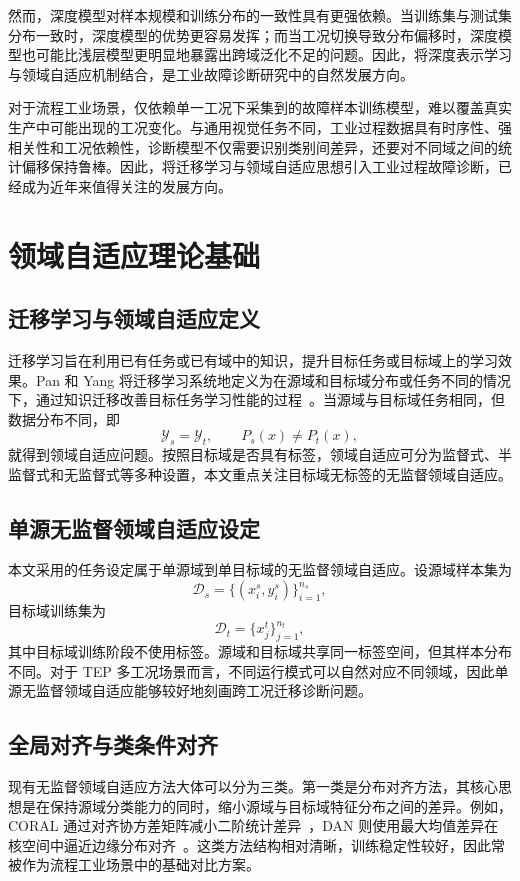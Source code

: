 然而，深度模型对样本规模和训练分布的一致性具有更强依赖。当训练集与测试集分布一致时，深度模型的优势更容易发挥；而当工况切换导致分布偏移时，深度模型也可能比浅层模型更明显地暴露出跨域泛化不足的问题。因此，将深度表示学习与领域自适应机制结合，是工业故障诊断研究中的自然发展方向。

对于流程工业场景，仅依赖单一工况下采集到的故障样本训练模型，难以覆盖真实生产中可能出现的工况变化。与通用视觉任务不同，工业过程数据具有时序性、强相关性和工况依赖性，诊断模型不仅需要识别类别间差异，还要对不同域之间的统计偏移保持鲁棒。因此，将迁移学习与领域自适应思想引入工业过程故障诊断，已经成为近年来值得关注的发展方向。

\section{领域自适应理论基础}
\subsection{迁移学习与领域自适应定义}
迁移学习旨在利用已有任务或已有域中的知识，提升目标任务或目标域上的学习效果。Pan 和 Yang 将迁移学习系统地定义为在源域和目标域分布或任务不同的情况下，通过知识迁移改善目标任务学习性能的过程~\cite{pan2009survey}。当源域与目标域任务相同，但数据分布不同，即
\begin{equation}
\mathcal{Y}_s=\mathcal{Y}_t,\qquad P_s(x)\neq P_t(x),
\end{equation}
就得到领域自适应问题。按照目标域是否具有标签，领域自适应可分为监督式、半监督式和无监督式等多种设置，本文重点关注目标域无标签的无监督领域自适应。

\subsection{单源无监督领域自适应设定}
本文采用的任务设定属于单源域到单目标域的无监督领域自适应。设源域样本集为
\begin{equation}
\mathcal{D}_s=\{(x_i^s,y_i^s)\}_{i=1}^{n_s},
\end{equation}
目标域训练集为
\begin{equation}
\mathcal{D}_t=\{x_j^t\}_{j=1}^{n_t},
\end{equation}
其中目标域训练阶段不使用标签。源域和目标域共享同一标签空间，但其样本分布不同。对于 TEP 多工况场景而言，不同运行模式可以自然对应不同领域，因此单源无监督领域自适应能够较好地刻画跨工况迁移诊断问题。

\subsection{全局对齐与类条件对齐}
现有无监督领域自适应方法大体可以分为三类。第一类是分布对齐方法，其核心思想是在保持源域分类能力的同时，缩小源域与目标域特征分布之间的差异。例如，CORAL 通过对齐协方差矩阵减小二阶统计差异~\cite{sun2016deep}，DAN 则使用最大均值差异在核空间中逼近边缘分布对齐~\cite{long2015dan}。这类方法结构相对清晰，训练稳定性较好，因此常被作为流程工业场景中的基础对比方案。

